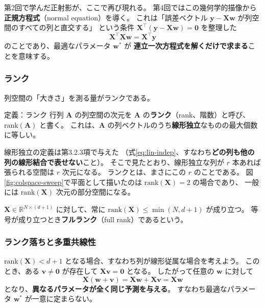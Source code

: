 第2回で学んだ正射影が、ここで再び現れる。
第4回ではこの幾何学的描像から\textbf{正規方程式}（normal equation）を導く。
これは「誤差ベクトル $\bm{y} - \bm{X}\bm{w}$ が列空間のすべての列と直交する」
という条件 $\bm{X}^\top (\bm{y} - \bm{X}\bm{w}) = \bm{0}$ を整理した
\begin{equation}
  \bm{X}^\top \bm{X} \bm{w} = \bm{X}^\top \bm{y}
  \label{eq:normal-intro}
\end{equation}
のことであり、最適なパラメータ $\bm{w}^*$ が
\textbf{連立一次方程式を解くだけで求まる}ことを意味する。

\subsubsection{ランク}

列空間の「大きさ」を測る量がランクである。

\begin{itembox}[l]{定義：ランク}
行列 $\bm{A}$ の列空間の次元を $\bm{A}$ の\textbf{ランク}（rank、階数）と呼び、
$\mathrm{rank}(\bm{A})$ と書く。
これは、$\bm{A}$ の列ベクトルのうち\textbf{線形独立}なものの最大個数に等しい。
\end{itembox}

線形独立の定義は第3.2.3項で与えた
（式\eqref{eq:lin-indep}、すなわち\textbf{どの列も他の列の線形結合で表せない}こと）。
そこで見たとおり、線形独立な列が $r$ 本あれば張られる空間は $r$ 次元になる。
ランクとは、まさにこの $r$ のことである。
図\ref{fig:colspace-sweep}で平面として描いたのは $\mathrm{rank}(\bm{X}) = 2$ の場合であり、
一般には $\mathrm{rank}(\bm{X})$ 次元の部分空間になる。

$\bm{X} \in \mathbb{R}^{N \times (d+1)}$ に対して、常に
$\mathrm{rank}(\bm{X}) \leq \min(N, d+1)$ が成り立つ。
等号が成り立つとき\textbf{フルランク}（full rank）であるという。

\subsubsection{ランク落ちと多重共線性}

$\mathrm{rank}(\bm{X}) < d+1$ となる場合、すなわち列が線形従属な場合を考えよう。
このとき、ある $\bm{v} \neq \bm{0}$ が存在して $\bm{X}\bm{v} = \bm{0}$ となる。
したがって任意の $\bm{w}$ に対して
\begin{equation}
  \bm{X}(\bm{w} + \bm{v}) = \bm{X}\bm{w} + \bm{X}\bm{v} = \bm{X}\bm{w}
  \label{eq:rank-shift}
\end{equation}
となり、\textbf{異なるパラメータが全く同じ予測を与える}。
すなわち最適なパラメータ $\bm{w}^*$ が一意に定まらない。


